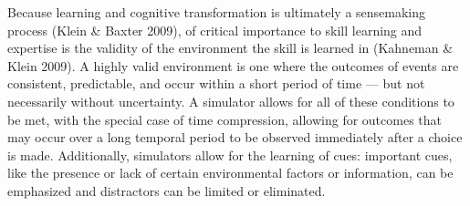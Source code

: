 \documentclass{book}
\begin{document}
Because learning and cognitive transformation is ultimately a sensemaking process (Klein & Baxter 2009), of critical importance to skill learning and expertise is the validity of the environment the skill is learned in (Kahneman & Klein 2009). A highly valid environment is one where the outcomes of events are consistent, predictable, and occur within a short period of time — but not necessarily without uncertainty. A simulator allows for all of these conditions to be met, with the special case of time compression, allowing for outcomes that may occur over a long temporal period to be observed immediately after a choice is made. Additionally, simulators allow for the learning of cues: important cues, like the presence or lack of certain environmental factors or information, can be emphasized and distractors can be limited or eliminated.
\end{document}
